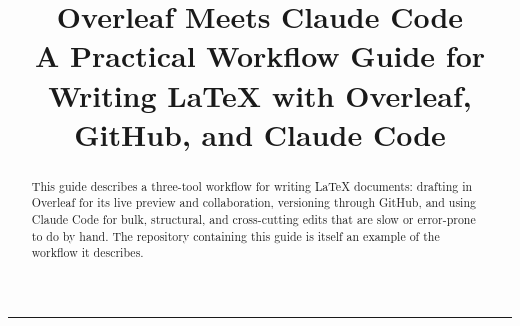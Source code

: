 \documentclass[11pt,a4paper]{article}
\title{\textbf{Overleaf Meets Claude Code}\\[2pt]\large A Practical Workflow Guide for Writing \LaTeX{} with Overleaf, GitHub, and Claude Code}
\author{}
\date{}
\begin{document}
\maketitle
\thispagestyle{empty}

\begin{abstract}
\noindent This guide describes a three-tool workflow for writing \LaTeX{} documents: drafting in Overleaf for its live preview and collaboration, versioning through GitHub, and using Claude Code for bulk, structural, and cross-cutting edits that are slow or error-prone to do by hand. The repository containing this guide is itself an example of the workflow it describes.
\end{abstract}

\tableofcontents
\vspace{1em}
\hrule
\vspace{1em}









\end{document}
